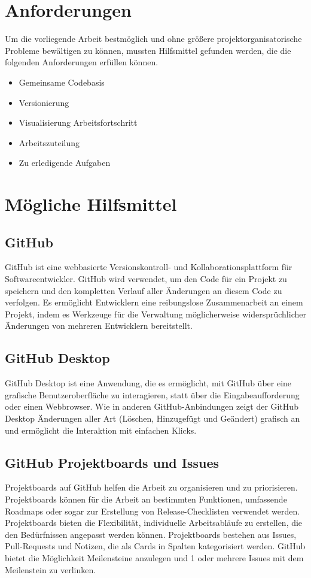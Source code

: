 \section{Anforderungen}
Um die vorliegende Arbeit bestmöglich und ohne größere projektorganisatorische Probleme bewältigen zu können, mussten Hilfsmittel 
gefunden werden, die die folgenden Anforderungen erfüllen können.   
\begin{itemize}
    \item Gemeinsame Codebasis
    \item Versionierung
    \item Visualisierung Arbeitsfortschritt
    \item Arbeitszuteilung
    \item Zu erledigende Aufgaben
\end{itemize}

\section{Mögliche Hilfsmittel}
\subsection{GitHub}
\label{chap:github}
GitHub ist eine webbasierte Versionskontroll- und Kollaborationsplattform für Softwareentwickler. 
GitHub wird verwendet, um den Code für ein Projekt zu speichern und den kompletten Verlauf aller 
Änderungen an diesem Code zu verfolgen. Es ermöglicht Entwicklern eine reibungslose Zusammenarbeit 
an einem Projekt, indem es Werkzeuge für die Verwaltung möglicherweise widersprüchlicher Änderungen 
von mehreren Entwicklern bereitstellt. \cite{noauthor_github_2022}

\subsection{GitHub Desktop}
\label{chap:desktop}
GitHub Desktop ist eine Anwendung, die es ermöglicht, 
mit GitHub über eine grafische Benutzeroberfläche zu interagieren, statt über die 
Eingabeaufforderung oder einen Webbrowser. Wie in anderen GitHub-Anbindungen zeigt der GitHub Desktop 
Änderungen aller Art (Löschen, Hinzugefügt und Geändert) grafisch an und ermöglicht die Interaktion mit 
einfachen Klicks. \cite{noauthor_github_nodate}

\subsection{GitHub Projektboards und Issues}
Projektboards auf GitHub helfen die Arbeit zu organisieren und zu priorisieren. 
Projektboards können für die Arbeit an bestimmten Funktionen, umfassende Roadmaps oder sogar zur Erstellung von
Release-Checklisten verwendet werden. Projektboards bieten die Flexibilität, individuelle 
Arbeitsabläufe zu erstellen, die den Bedürfnissen angepasst werden können. Projektboards bestehen aus 
Issues, Pull-Requests und Notizen, die als Cards in Spalten kategorisiert werden. GitHub bietet
die Möglichkeit Meilensteine anzulegen und 1 oder mehrere Issues mit dem Meilenstein zu verlinken. \cite{noauthor_github_nodate-1}

